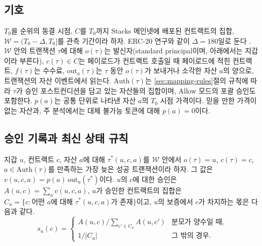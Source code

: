 \section{\PCER}
\label{sec:method}

\subsection{기호}

$T_0$을 순위의 동결 시점, $C$를 $T_0$까지 Stacks 메인넷에 배포된 컨트랙트의 집합, $\mathcal{W}=(T_0-\Delta,T_0]$를 관측 기간이라 하자. ERC-20 연구와 같이 $\Delta=180$일로 둔다 \cite{kwon2026endorserank}. $\mathcal{W}$ 안의 트랜잭션 $\tau$에 대해 $o(\tau)$는 발신자(standard principal이며, 아래에서는 지갑이라 부른다), $c(\tau)\in C$는 페이로드가 컨트랙트 호출일 때 페이로드에 적힌 컨트랙트, $f(\tau)$는 수수료, $\mathrm{out}_a(\tau)$는 $\tau$ 동안 $o(\tau)$가 보내거나 소각한 자산 $a$의 양으로, 트랜잭션의 자산 이벤트에서 읽는다. $\mathrm{Auth}(\tau)$는 \ref{sec:mapping-rules}절의 규칙에 따라 $\tau$가 승인 포스트컨디션을 담고 있는 자산들의 집합이며, Allow 모드의 포괄 승인도 포함한다. $p(a)$는 공통 단위로 나타낸 자산 $a$의 $T_0$ 시점 가격이다. 믿을 만한 가격이 없는 자산과, 주 분석에서는 대체 불가능 토큰에 대해 $p(a)=0$이다.

\subsection{승인 기록과 최신 상태 규칙}
\label{sec:method-records}

\begin{definition}[승인 기록]
지갑 $u$, 컨트랙트 $c$, 자산 $a$에 대해 $\tau^{*}(u,c,a)$를 $\mathcal{W}$ 안에서 $o(\tau)=u$, $c(\tau)=c$, $a\in\mathrm{Auth}(\tau)$를 만족하는 가장 늦은 성공 트랜잭션이라 하자. 그 값은 $v(u,c,a)=p(a)\,\mathrm{out}_a(\tau^{*})$이다. $u$의 $c$에 대한 승인은 $A(u,c)=\sum_a v(u,c,a)$, $u$가 승인한 컨트랙트의 집합은 $C_u=\{c : \text{어떤 } a\text{에 대해 } \tau^{*}(u,c,a)\text{가 존재}\}$이고, $u$의 보증에서 $c$가 차지하는 몫은 다음과 같다.
\begin{equation}
\label{eq:share}
s_u(c)=
\begin{cases}
A(u,c)\big/\sum_{c'\in C_u}A(u,c') & \text{분모가 양수일 때,}\\
1/|C_u| & \text{그 밖의 경우.}
\end{cases}
\end{equation}
\end{definition}

